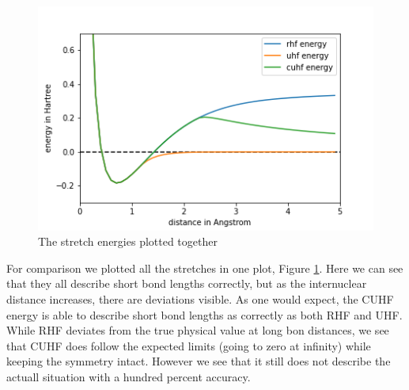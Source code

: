 \documentclass[twoside,twocolumn,9pt]{article}
\begin{document}
\begin{center}
  \begin{figure}[h]
    \includegraphics[width=\linewidth]{./../notes/figures/combo.png}
    \caption{The stretch energies plotted together}
    \label{fig:combo}
  \end{figure}
\end{center}

For comparison we plotted all the stretches in one plot, Figure \ref{fig:combo}. Here we can see that they all describe short bond lengths correctly, but as the internuclear distance
increases, there are deviations visible. As one would expect, the CUHF energy is able to describe short bond lengths as correctly as both RHF and UHF. While RHF deviates from the
true physical value at long bon distances, we see that CUHF does follow the expected limits (going to zero at infinity) while keeping the symmetry intact. However we see that it still
does not describe the actuall situation with a hundred percent accuracy.
\end{document}
